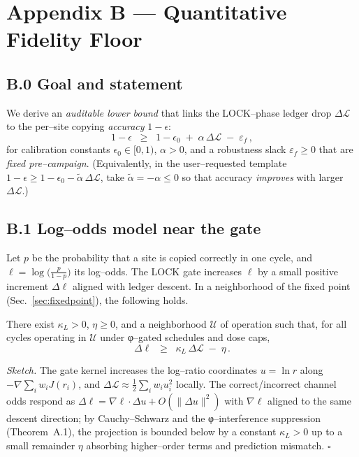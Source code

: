 \documentclass[11pt]{article}
\begin{document}
\section*{Appendix B — Quantitative Fidelity Floor}\label{app:fidelity-floor}

\subsection*{B.0 Goal and statement}
We derive an \emph{auditable lower bound} that links the \textsf{LOCK}–phase ledger drop $\Delta\mathcal{L}$ to the per–site copying \emph{accuracy} $1-\epsilon$:
\begin{equation}\label{eq:floor-form}
1-\epsilon \;\;\ge\;\; 1-\epsilon_0 \;+\; \alpha\,\Delta\mathcal{L} \;-\; \varepsilon_f\,,
\end{equation}
for calibration constants $\epsilon_0\!\in[0,1)$, $\alpha\!>\!0$, and a robustness slack $\varepsilon_f\!\ge\!0$ that are \emph{fixed pre–campaign}.  
(Equivalently, in the user–requested template $1-\epsilon \ge 1-\epsilon_0 - \tilde\alpha\,\Delta\mathcal{L}$, take $\tilde\alpha=-\alpha\le 0$ so that accuracy \emph{improves} with larger $\Delta\mathcal{L}$.)

\subsection*{B.1 Log–odds model near the gate}
Let $p$ be the probability that a site is copied correctly in one cycle, and $\ell=\log\!\big(\frac{p}{1-p}\big)$ its log–odds. The \textsf{LOCK} gate increases $\ell$ by a small positive increment $\Delta \ell$ aligned with ledger descent. In a neighborhood of the fixed point (Sec.~\ref{sec:fixedpoint}), the following holds.

\begin{lemma}\label{lem:logodds}
There exist $\kappa_L>0$, $\eta\ge 0$, and a neighborhood $\mathcal{U}$ of operation such that, for all cycles operating in $\mathcal{U}$ under φ–gated schedules and dose caps,
\begin{equation}\label{eq:logodds}
\Delta \ell \;\;\ge\;\; \kappa_L\,\Delta\mathcal{L} \;-\; \eta\,.
\end{equation}
\end{lemma}

\emph{Sketch.} The gate kernel increases the log–ratio coordinates $u=\ln r$ along $-\nabla \sum_i w_i J(r_i)$, and $\Delta\mathcal{L}\approx \tfrac12\sum_i w_i u_i^2$ locally. The correct/incorrect channel odds respond as $\Delta \ell = \nabla \ell \cdot \Delta u + O(\|\Delta u\|^2)$ with $\nabla \ell$ aligned to the same descent direction; by Cauchy–Schwarz and the φ–interference suppression (Theorem~A.1), the projection is bounded below by a constant $\kappa_L>0$ up to a small remainder $\eta$ absorbing higher–order terms and prediction mismatch. \hfill$\square$
\end{document}

